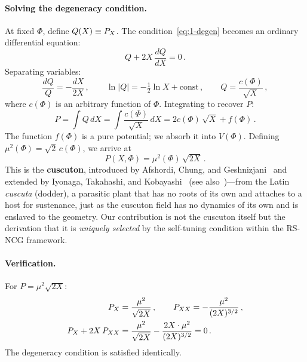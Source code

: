 \paragraph{Solving the degeneracy condition.} At fixed $\Phi$, define $Q(X) \equiv P_X$. The condition~\eqref{eq:1-degen} becomes an ordinary differential equation:
\begin{equation}
\label{eq:1-ode}
Q + 2X\, \frac{dQ}{dX} = 0\,.
\end{equation}
Separating variables:
\begin{equation}
\label{eq:1-ode-solve}
\frac{dQ}{Q} = -\frac{dX}{2X}\,, \qquad
\ln|Q| = -\tfrac{1}{2}\ln X + \mathrm{const}\,, \qquad
Q = \frac{c(\Phi)}{\sqrt{X}}\,,
\end{equation}
where $c(\Phi)$ is an arbitrary function of $\Phi$. Integrating to recover $P$:
\begin{equation}
\label{eq:1-integrate-P}
P = \int Q\, dX = \int \frac{c(\Phi)}{\sqrt{X}}\, dX = 2c(\Phi)\,\sqrt{X} + f(\Phi)\,.
\end{equation}
The function $f(\Phi)$ is a pure potential; we absorb it into $V(\Phi)$. Defining $\mu^2(\Phi) = \sqrt{2}\,c(\Phi)$, we arrive at
\begin{equation}
\label{eq:1-cuscuton}
\boxed{P(X, \Phi) = \mu^2(\Phi)\,\sqrt{2X}\,.}
\end{equation}
This is the \textbf{cuscuton}, introduced by Afshordi, Chung, and Geshnizjani~\cite{ch1:afshordi07} and extended by Iyonaga, Takahashi, and Kobayashi~\cite{ch1:iyonaga18} (see also~\cite{ch1:appleby22})---from the Latin \emph{cuscuta} (dodder), a parasitic plant that has no roots of its own and attaches to a host for sustenance, just as the cuscuton field has no dynamics of its own and is enslaved to the geometry. Our contribution is not the cuscuton itself but the derivation that it is \emph{uniquely selected} by the self-tuning condition within the RS-NCG framework.

\paragraph{Verification.} For $P = \mu^2\sqrt{2X}$:
\begin{align}
\label{eq:1-verify}
P_X &= \frac{\mu^2}{\sqrt{2X}}\,, \qquad
P_{XX} = -\frac{\mu^2}{(2X)^{3/2}}\,, \notag\\
P_X + 2X\,P_{XX} &= \frac{\mu^2}{\sqrt{2X}} - \frac{2X \cdot \mu^2}{(2X)^{3/2}} = 0\,.
\end{align}
The degeneracy condition is satisfied identically.

